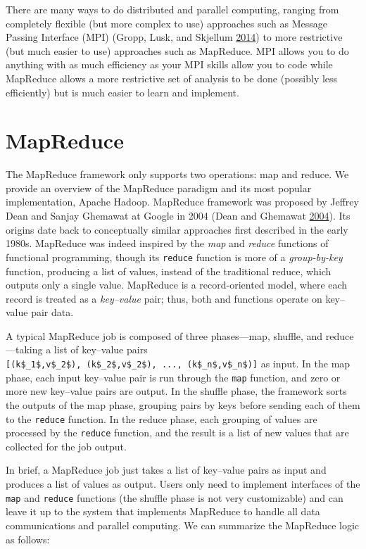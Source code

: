 \documentclass[]{krantz}
\begin{document}
There are many ways to do distributed and parallel computing, ranging
from completely flexible (but more complex to use) approaches such as
Message Passing Interface (MPI) (Gropp, Lusk, and Skjellum
\protect\hyperlink{ref-mpi}{2014}) to more restrictive (but much easier
to use) approaches such as MapReduce. MPI allows you to do anything with
as much efficiency as your MPI skills allow you to code while MapReduce
allows a more restrictive set of analysis to be done (possibly less
efficiently) but is much easier to learn and implement.

\section{MapReduce}\label{sec:intro}

The MapReduce framework only supports two operations: map and reduce. We
provide an overview of the MapReduce paradigm and its most popular
implementation, Apache Hadoop. MapReduce framework was proposed by
Jeffrey Dean and Sanjay Ghemawat at Google in 2004 (Dean and Ghemawat
\protect\hyperlink{ref-MapReduce}{2004}). Its origins date back to
conceptually similar approaches first described in the early 1980s.
MapReduce was indeed inspired by the \emph{map} and \emph{reduce}
functions of functional programming, though its \texttt{reduce} function
is more of a \emph{group-by-key} function, producing a list of values,
instead of the traditional reduce, which outputs only a single value.
MapReduce is a record-oriented model, where each record is treated as a
\emph{key--value} pair; thus, both and functions operate on key--value
pair data.

A typical MapReduce job is composed of three phases---map, shuffle, and
reduce---taking a list of key--value pairs
\texttt{{[}(k\$\_1\$,v\$\_2\$),\ (k\$\_2\$,v\$\_2\$),\ ...,\ (k\$\_n\$,v\$\_n\$){]}}
as input. In the map phase, each input key--value pair is run through
the \texttt{map} function, and zero or more new key--value pairs are
output. In the shuffle phase, the framework sorts the outputs of the map
phase, grouping pairs by keys before sending each of them to the
\texttt{reduce} function. In the reduce phase, each grouping of values
are processed by the \texttt{reduce} function, and the result is a list
of new values that are collected for the job output.

In brief, a MapReduce job just takes a list of key--value pairs as input
and produces a list of values as output. Users only need to implement
interfaces of the \texttt{map} and \texttt{reduce} functions (the
shuffle phase is not very customizable) and can leave it up to the
system that implements MapReduce to handle all data communications and
parallel computing. We can summarize the MapReduce logic as follows:
\end{document}
